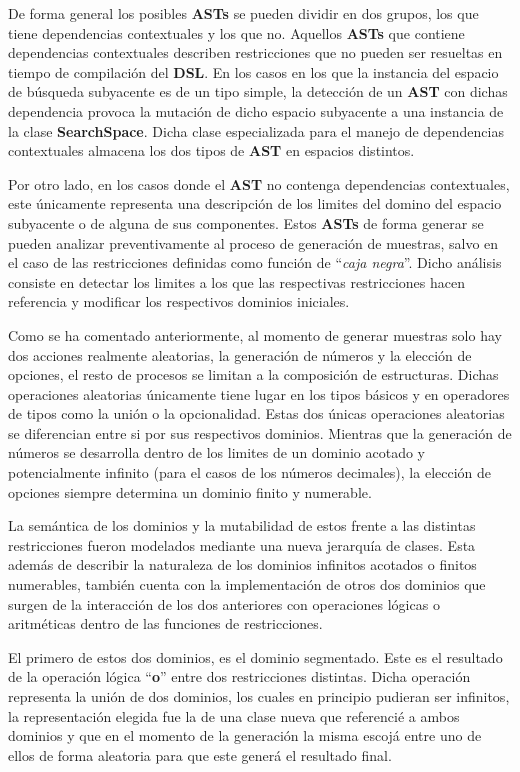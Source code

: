De forma general los posibles {\bf ASTs} se pueden dividir en dos grupos, los que tiene dependencias contextuales
y los que no. Aquellos {\bf ASTs} que contiene dependencias contextuales describen restricciones que no pueden ser
resueltas en tiempo de compilación del {\bf DSL}. En los casos en los que la instancia del espacio de búsqueda subyacente
es de un tipo simple, la detección de un {\bf AST }con dichas dependencia provoca la mutación de dicho espacio subyacente
a una instancia de la clase {\bf SearchSpace}. Dicha clase especializada para el manejo de dependencias contextuales
almacena los dos tipos de {\bf AST} en espacios distintos.

Por otro lado, en los casos donde el {\bf AST} no contenga dependencias contextuales, este únicamente representa una
descripción de los limites del domino del espacio subyacente o de alguna de sus componentes. Estos {\bf ASTs} de forma
generar se pueden analizar preventivamente al proceso de generación de muestras, salvo en el caso de las restricciones
definidas como función de ``{\it caja negra}''. Dicho análisis consiste en detectar los limites a los que las respectivas
restricciones hacen referencia y modificar los respectivos dominios iniciales.

Como se ha comentado anteriormente, al momento de generar muestras solo hay dos acciones realmente aleatorias, la
generación de números y la elección de opciones, el resto de procesos se limitan a la composición de estructuras.
Dichas operaciones aleatorias únicamente tiene lugar en los tipos básicos y en operadores de tipos como la unión o
la opcionalidad. Estas dos únicas operaciones aleatorias se diferencian entre si por sus respectivos dominios. Mientras
que la generación de números se desarrolla dentro de los limites de un dominio acotado y potencialmente infinito (para
el casos de los números decimales), la elección de opciones siempre determina un dominio finito y numerable.

La semántica de los dominios y la mutabilidad de estos frente a las distintas restricciones fueron modelados mediante una
nueva jerarquía de clases. Esta además de describir la naturaleza de los dominios infinitos acotados o finitos numerables,
también cuenta con la implementación de otros dos dominios que surgen de la interacción de los dos anteriores con operaciones
lógicas o aritméticas dentro de las funciones de restricciones.

El primero de estos dos dominios, es el dominio segmentado. Este es el resultado de la operación lógica ``{\bf o}'' entre dos
restricciones distintas. Dicha operación representa la unión de dos dominios, los cuales en principio pudieran ser
infinitos, la representación elegida fue la de una clase nueva que referencié a ambos dominios y que en el momento de la
generación la misma escojá entre uno de ellos de forma aleatoria para que este generá el resultado final.

